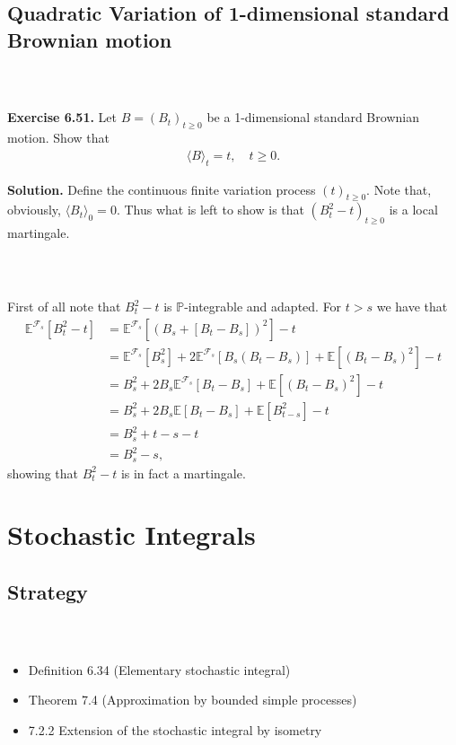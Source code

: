 \documentclass{beamer}
\numberwithin{equation}{section}
\newenvironment{frame2}{\begin{frame}\frametitle{{\normalsize \secname} \\ {\large \subsecname}}}{\end{frame}}
\begin{document}
\subsection{Quadratic Variation of 1-dimensional standard Brownian motion}

\begin{frame2}
    \textbf{Exercise 6.51.}
    Let $B=(B_t)_{t\geq 0}$ be a 1-dimensional standard Brownian motion.
    Show that
    \begin{align}
        \langle B \rangle_t = t, \quad t\geq 0.
    \end{align}
    
    \vspace{10pt}
    \textbf{Solution.}
    Define the continuous finite variation process $(t)_{t\geq 0}$. 
    Note that, obviously, $\langle B_t \rangle_0 = 0$.
    Thus what is left to show is that $(B_t^2-t)_{t\geq 0}$ is a local martingale.
\end{frame2}

\begin{frame2}
    First of all note that $B_t^2-t$ is $\mathbb{P}$-integrable and adapted.
    For $t > s$ we have that
    \begin{align*}
        \mathbb{E}^{\mathcal{F}_s}\left[B_t^2-t\right]&= \mathbb{E}^{\mathcal{F}_s}\left[(B_s+[B_t-B_s])^2\right]-t \\
        &= \mathbb{E}^{\mathcal{F}_s}\left[B_s^2\right] +2\mathbb{E}^{\mathcal{F}_s}[B_s(B_t-B_s)] + \mathbb{E}\left[(B_t-B_s)^2\right]-t \\
        &=B_s^2 + 2B_s \mathbb{E}^{\mathcal{F}_s}[B_t-B_s]+\mathbb{E}\left[(B_t-B_s)^2\right]-t \\
        &= B_s^2+2B_s\mathbb{E}[B_t-B_s]+\mathbb{E}\left[B_{t-s}^2\right]-t \\
        &=B_s^2 + t - s - t \\
        &= B_s^2 - s,
    \end{align*}
    showing that $B_t^2-t$ is in fact a martingale.
\end{frame2}

\section{Stochastic Integrals}

\subsection{Strategy}
\begin{frame2}
    \begin{itemize}
        \item Definition 6.34 (Elementary stochastic integral)
        \item Theorem 7.4 (Approximation by bounded simple processes)
        \item 7.2.2 Extension of the stochastic integral by isometry
    \end{itemize}
\end{frame2}
\end{document}
